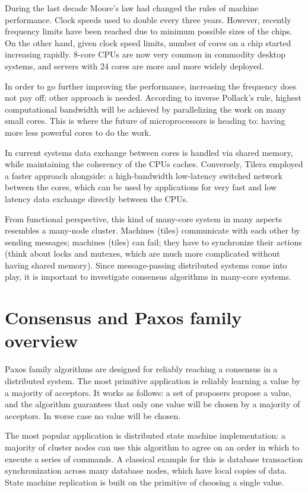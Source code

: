 \documentclass[english,11pt]{article}
\begin{document}
During the last decade Moore's law had changed the rules of machine performance.
Clock speeds used to double every three years. However, recently frequency
limits have been reached due to minimum possible sizes of the chips. On the
other hand, given clock speed limits, number of cores on a chip started
increasing rapidly. 8-core CPUs are now very common in commodity desktop
systems, and servers with 24 cores are more and more widely deployed.

In order to go further improving the performance, increasing the frequency does
not pay off; other approach is needed. According to inverse Pollack's
rule\cite{pollack}, highest computational bandwidth will be achieved by
parallelizing the work on many small cores\cite{1kcorechips}. This is where the
future of microprocessors is heading to: having more less powerful cores to do
the work\cite{future-microprocessors}.

In current systems data exchange between cores is handled via shared memory,
while maintaining the coherency of the CPUs caches. Conversely, Tilera employed
a faster approach alongside: a high-bandwidth low-latency switched network
between the cores, which can be used by applications for very fast and low
latency data exchange directly between the CPUs\cite{tile64}.

From functional perspective, this kind of many-core system in many aspects
resembles a many-node cluster. Machines (tiles) communicate with each other by
sending messages; machines (tiles) can fail; they have to synchronize their
actions (think about locks and mutexes, which are much more complicated without
having shared memory). Since message-passing distributed systems come into play,
it is important to investigate consensus algorithms in many-core systems.

\section{Consensus and Paxos family overview}
\label{sec:paxos-family}

Paxos family algorithms are designed for reliably reaching a consensus in a
distributed system. The most primitive application is reliably learning a value
by a majority of acceptors. It works as follows: a set of proposers propose a
value, and the algorithm guarantees that only one value will be chosen by a
majority of acceptors. In worse case no value will be chosen.

The most popular application is distributed state machine implementation: a
majority of cluster nodes can use this algorithm to agree on an order in which
to execute a series of commands. A classical example for this is database
transaction synchronization across many database nodes, which have local copies
of data. State machine replication is built on the primitive of choosing a
single value.
\end{document}
